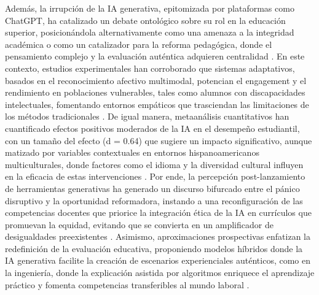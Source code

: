\documentclass[spanish]{textolivre}
\begin{document}
Además, la irrupción de la IA generativa, epitomizada por plataformas como ChatGPT, ha catalizado un debate ontológico sobre su rol en la educación superior, posicionándola alternativamente como una amenaza a la integridad académica o como un catalizador para la reforma pedagógica, donde el pensamiento complejo y la evaluación auténtica adquieren centralidad \cite{yusuf2024, romerorodriguez2023}. En este contexto, estudios experimentales han corroborado que sistemas adaptativos, basados en el reconocimiento afectivo multimodal, potencian el engagement y el rendimiento en poblaciones vulnerables, tales como alumnos con discapacidades intelectuales, fomentando entornos empáticos que trasciendan las limitaciones de los métodos tradicionales \cite{standen2020}. De igual manera, metaanálisis cuantitativos han cuantificado efectos positivos moderados de la IA en el desempeño estudiantil, con un tamaño del efecto (d = 0.64) que sugiere un impacto significativo, aunque matizado por variables contextuales en entornos hispanoamericanos multiculturales, donde factores como el idioma y la diversidad cultural influyen en la eficacia de estas intervenciones \cite{garciamartinez2023}. Por ende, la percepción post-lanzamiento de herramientas generativas ha generado un discurso bifurcado entre el pánico disruptivo y la oportunidad reformadora, instando a una reconfiguración de las competencias docentes que priorice la integración ética de la IA en currículos que promuevan la equidad, evitando que se convierta en un amplificador de desigualdades preexistentes \cite{garciapenalvo2023, garciapenalvo2024}. Asimismo, aproximaciones prospectivas enfatizan la redefinición de la evaluación educativa, proponiendo modelos híbridos donde la IA generativa facilite la creación de escenarios experienciales auténticos, como en la ingeniería, donde la explicación asistida por algoritmos enriquece el aprendizaje práctico y fomenta competencias transferibles al mundo laboral \cite{salinasnavarro2024}.
\end{document}
